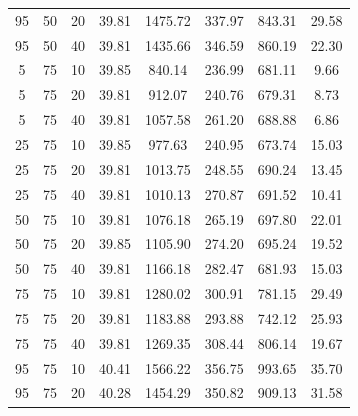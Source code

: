 \begin{table}[H]
\begin{tabular}{ccc|c|c|c|c|c}
95 & 50 & 20 & \cellcolor{gray!80}39.81 & \cellcolor{gray!1}1475.72 & \cellcolor{gray!1}337.97 & \cellcolor{gray!24}843.31 & 29.58\\
95 & 50 & 40 & \cellcolor{gray!80}39.81 & \cellcolor{gray!1}1435.66 & \cellcolor{gray!1}346.59 & \cellcolor{gray!19}860.19 & 22.30\\
5 & 75 & 10 & \cellcolor{gray!80}39.85 & \cellcolor{gray!61}840.14 & \cellcolor{gray!24}236.99 & \cellcolor{gray!74}681.11 & 9.66\\
5 & 75 & 20 & \cellcolor{gray!80}39.81 & \cellcolor{gray!49}912.07 & \cellcolor{gray!21}240.76 & \cellcolor{gray!75}679.31 & 8.73\\
5 & 75 & 40 & \cellcolor{gray!80}39.81 & \cellcolor{gray!25}1057.58 & \cellcolor{gray!2}261.20 & \cellcolor{gray!72}688.88 & 6.86\\
25 & 75 & 10 & \cellcolor{gray!80}39.85 & \cellcolor{gray!38}977.63 & \cellcolor{gray!20}240.95 & \cellcolor{gray!76}673.74 & 15.03\\
25 & 75 & 20 & \cellcolor{gray!80}39.81 & \cellcolor{gray!32}1013.75 & \cellcolor{gray!13}248.55 & \cellcolor{gray!71}690.24 & 13.45\\
25 & 75 & 40 & \cellcolor{gray!80}39.81 & \cellcolor{gray!33}1010.13 & \cellcolor{gray!1}270.87 & \cellcolor{gray!71}691.52 & 10.41\\
50 & 75 & 10 & \cellcolor{gray!80}39.81 & \cellcolor{gray!22}1076.18 & \cellcolor{gray!1}265.19 & \cellcolor{gray!69}697.80 & 22.01\\
50 & 75 & 20 & \cellcolor{gray!80}39.85 & \cellcolor{gray!17}1105.90 & \cellcolor{gray!1}274.20 & \cellcolor{gray!70}695.24 & 19.52\\
50 & 75 & 40 & \cellcolor{gray!80}39.81 & \cellcolor{gray!7}1166.18 & \cellcolor{gray!1}282.47 & \cellcolor{gray!74}681.93 & 15.03\\
75 & 75 & 10 & \cellcolor{gray!80}39.81 & \cellcolor{gray!1}1280.02 & \cellcolor{gray!1}300.91 & \cellcolor{gray!43}781.15 & 29.49\\
75 & 75 & 20 & \cellcolor{gray!80}39.81 & \cellcolor{gray!4}1183.88 & \cellcolor{gray!1}293.88 & \cellcolor{gray!55}742.12 & 25.93\\
75 & 75 & 40 & \cellcolor{gray!80}39.81 & \cellcolor{gray!1}1269.35 & \cellcolor{gray!1}308.44 & \cellcolor{gray!36}806.14 & 19.67\\
95 & 75 & 10 & \cellcolor{gray!74}40.41 & \cellcolor{gray!1}1566.22 & \cellcolor{gray!1}356.75 & \cellcolor{gray!1}993.65 & 35.70\\
95 & 75 & 20 & \cellcolor{gray!76}40.28 & \cellcolor{gray!1}1454.29 & \cellcolor{gray!1}350.82 & \cellcolor{gray!4}909.13 & 31.58\\

\end{tabular}
\end{table}
